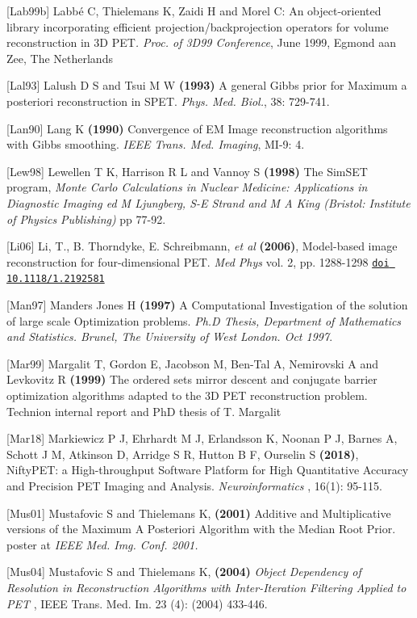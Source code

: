 \documentclass{article}
\def\url#1#2{\mbox{\href{#1}{\tt #2}}}
\begin{document}
{{{{{{{[}Lab99b] Labb\'{e} C, Thielemans K, Zaidi H and Morel C: An object-oriented 
library incorporating efficient projection/backprojection operators 
for volume reconstruction in 3D PET\textit{. Proc. of 3D99 Conference}, 
June 1999, Egmond aan Zee, The Netherlands 


{[}Lal93] Lalush D S and Tsui M W \textbf{(1993)} A general Gibbs prior 
for Maximum a posteriori reconstruction in SPET. \textit{Phys. Med. 
Biol.}, 38: 729-741.

{[}Lan90] Lang K \textbf{(1990)} Convergence of EM Image reconstruction 
algorithms with Gibbs smoothing. \textit{IEEE Trans. Med. Imaging}, 
MI-9: 4.

{[}Lew98] Lewellen T K, Harrison R L and Vannoy S \textbf{(1998)} 
The SimSET program,
\textit{ Monte Carlo Calculations in Nuclear Medicine:
Applications in Diagnostic Imaging ed M Ljungberg, S-E Strand and M A King (Bristol: Institute of Physics
Publishing)} pp 77-92.

[Li06] Li, T., B. Thorndyke, E.
Schreibmann, \textit{et al} \textbf{(2006)}, Model-based image reconstruction for
four-dimensional PET. \textit{Med Phys} vol. 2, pp. 1288-1298
\url{http://link.aip.org/link/doi/10.1118/1.2192581}{doi 10.1118/1.2192581}

{[}Man97] Manders Jones H \textbf{(1997)} A Computational Investigation 
of the solution of large scale Optimization problems. \textit{Ph.D 
Thesis, Department of Mathematics and Statistics. Brunel, The 
University of West London. Oct 1997}.


{[}Mar99] Margalit T, Gordon E, Jacobson M, Ben-Tal A, Nemirovski 
A and Levkovitz R \textbf{(1999)} The ordered sets mirror descent and 
conjugate barrier optimization algorithms adapted to the 3D PET 
reconstruction problem. Technion internal report and PhD thesis of T. Margalit

[Mar18] Markiewicz P J, Ehrhardt M J, Erlandsson K, Noonan P J, Barnes A, Schott J M, 
Atkinson D, Arridge S R, Hutton B F, Ourselin S \textbf{(2018)}, 
NiftyPET: a High-throughput Software Platform for High 
Quantitative Accuracy and Precision PET Imaging and Analysis.
\textit { Neuroinformatics }, 16(1): 95-115.

{[}Mus01] Mustafovic S and Thielemans K, \textbf{(2001)} Additive and Multiplicative 
versions of the Maximum A Posteriori Algorithm with the Median 
Root Prior. poster at \textit{IEEE Med. Img. Conf. 2001.}

{[}Mus04] Mustafovic S and Thielemans K, \textbf{(200}\textbf{4}\textbf{)} \textit{Object 
Dependency of Resolution in Reconstruction Algorithms with Inter-Iteration 
Filtering Applied to PET} , IEEE Trans. Med. Im. 23 (4): (2004) 
433-446.

}}}}}}
\end{document}

